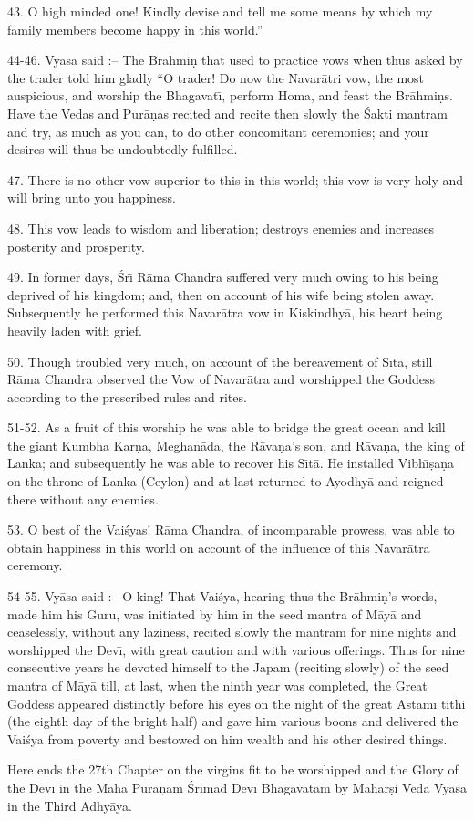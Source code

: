 43. O high minded one! Kindly devise and tell me some means by which my family members become happy in this world.''

44-46. Vy\=asa said :-- The Br\=ahmi\d{n} that used to practice vows when thus asked by the trader told him gladly ``O trader! Do now the Navar\=atri vow, the most auspicious, and worship the Bhagavat\={\i}, perform Homa, and feast the Br\=ahmi\d{n}s. Have the Vedas and Pur\=a\d{n}as recited and recite then slowly the \'Sakti mantram and try, as much as you can, to do other concomitant ceremonies; and your desires will thus be undoubtedly fulfilled.

47. There is no other vow superior to this in this world; this vow is very holy and will bring unto you happiness.

48. This vow leads to wisdom and liberation; destroys enemies and increases posterity and prosperity.

49. In former days, \'Sr\={\i} R\=ama Chandra suffered very much owing to his being deprived of his kingdom; and, then on account of his wife being stolen away. Subsequently he performed this Navar\=atra vow in Kiskindhy\=a, his heart being heavily laden with grief.

50. Though troubled very much, on account of the bereavement of S\={\i}t\=a, still R\=ama Chandra observed the Vow of Navar\=atra and worshipped the Goddess according to the prescribed rules and rites.

51-52. As a fruit of this worship he was able to bridge the great ocean and kill the giant Kumbha Kar\d{n}a, Meghan\=ada, the R\=ava\d{n}a's son, and R\=ava\d{n}a, the king of Lanka; and subsequently he was able to recover his S\={\i}t\=a. He installed Vibh\={\i}\d{s}a\d{n}a on the throne of Lanka (Ceylon) and at last returned to Ayodhy\=a and reigned there without any enemies.

53. O best of the Vai\'syas! R\=ama Chandra, of incomparable prowess, was able to obtain happiness in this world on account of the influence of this Navar\=atra ceremony.

54-55. Vy\=asa said :-- O king! That Vai\'sya, hearing thus the Br\=ahmi\d{n}'s words, made him his Guru, was initiated by him in the seed mantra of M\=ay\=a and ceaselessly, without any laziness, recited slowly the mantram for nine nights and worshipped the Dev\={\i}, with great caution and with various offerings. Thus for nine consecutive years he devoted himself to the Japam (reciting slowly) of the seed mantra of M\=ay\=a till, at last, when the ninth year was completed, the Great Goddess appeared distinctly before his eyes on the night of the great Astam\={\i} tithi (the eighth day of the bright half) and gave him various boons and delivered the Vai\'sya from poverty and bestowed on him wealth and his other desired things.

Here ends the 27th Chapter on the virgins fit to be worshipped and the Glory of the Dev\={\i} in the Mah\=a Pur\=a\d{n}am \'Sr\={\i}mad Dev\={\i} Bh\=agavatam by Mahar\d{s}i Veda Vy\=asa in the Third Adhy\=aya.



